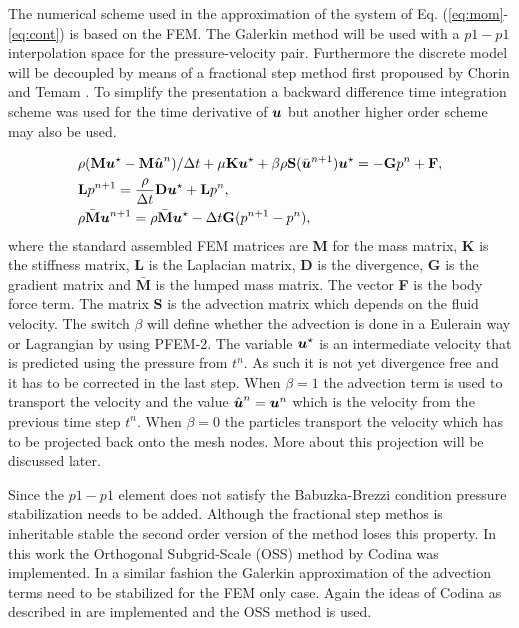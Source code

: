 The numerical scheme used in the approximation of the system of Eq. (\ref{eq:mom}-\ref{eq:cont}) is based on the FEM. The Galerkin method will be used with a $p1-p1$ interpolation space for the pressure-velocity pair. Furthermore the discrete model will be decoupled by means of a fractional step method first propoused by Chorin \cite{chorin} and Temam \cite{temam}. To simplify the presentation a backward difference time integration scheme was used for the time derivative of $\boldsymbol{u}$ but another higher order scheme may also be used. 

\begin{align}\label{eq:masamat}
&\rho (\textbf{M}\boldsymbol{u}^\star-\textbf{M}\hat{\boldsymbol{u}}^n)/\Delta t+\mu\textbf{K}\boldsymbol{u}^{\star} +\beta\rho\textbf{S}(\bar{\boldsymbol{u}}^{n+1})\boldsymbol{u}^{\star}  = -\textbf{G}p^n+ \textbf{F},
\\\label{eq:matpres2}
& \textbf{L}p^{n+1}=\frac{\rho}{\Delta t}\textbf{D}\boldsymbol{u}^\star+ \textbf{L}  p^{n},
\\\label{eq:matunm2}
&\rho \bar{\textbf{M}}\boldsymbol{u}^{n+1}=\rho \bar{\textbf{M}}\boldsymbol{u}^\star-\Delta t\textbf{G}(p^{n+1}- p^n),
\end{align}
where the standard assembled FEM matrices are \textbf{M} for the mass matrix, \textbf{K} is the stiffness matrix, \textbf{L} is the Laplacian matrix, \textbf{D} is the divergence, \textbf{G} is the gradient matrix and $\bar{\textbf{M}}$ is the lumped mass matrix. The vector \textbf{F} is the body force term. The matrix \textbf{S} is the advection matrix which depends on the fluid velocity. The switch $\beta$ will define whether the advection is done in a Eulerain way or Lagrangian by using PFEM-2. The variable $\boldsymbol{u}^\star$ is an intermediate velocity that is predicted using the pressure from $t^n$. As such it is not yet divergence free and it has to be corrected in the last step. When $\beta=1$ the advection term is used to transport the velocity and the value $\hat{\boldsymbol{u}}^n=\boldsymbol{u}^n$ which is the velocity from the previous time step $t^n$. When $\beta=0$ the particles transport the velocity which has to be projected back onto the mesh nodes. More about this projection will be discussed later.

Since the $p1-p1$ element does not satisfy the Babuzka-Brezzi condition pressure stabilization needs to be added. Although the fractional step methos is inheritable stable the second order version of the method loses this property. In this work the Orthogonal Subgrid-Scale (OSS) method by Codina \cite{codina-oss-press} was implemented. In a similar fashion the Galerkin approximation of the advection terms need to be stabilized for the FEM only case. Again the ideas of Codina as described in \cite{codina-soto} are implemented and the OSS method is used. 
